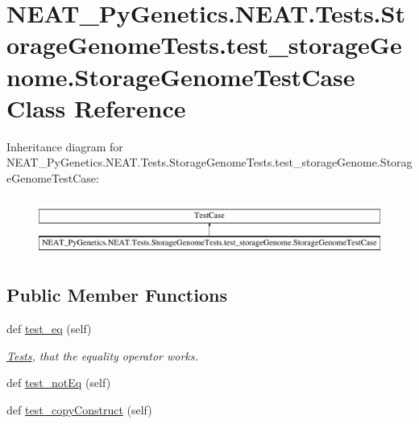 \hypertarget{classNEAT__PyGenetics_1_1NEAT_1_1Tests_1_1StorageGenomeTests_1_1test__storageGenome_1_1StorageGenomeTestCase}{}\section{N\+E\+A\+T\+\_\+\+Py\+Genetics.\+N\+E\+A\+T.\+Tests.\+Storage\+Genome\+Tests.\+test\+\_\+storage\+Genome.\+Storage\+Genome\+Test\+Case Class Reference}
\label{classNEAT__PyGenetics_1_1NEAT_1_1Tests_1_1StorageGenomeTests_1_1test__storageGenome_1_1StorageGenomeTestCase}
Inheritance diagram for N\+E\+A\+T\+\_\+\+Py\+Genetics.\+N\+E\+A\+T.\+Tests.\+Storage\+Genome\+Tests.\+test\+\_\+storage\+Genome.\+Storage\+Genome\+Test\+Case\+:\begin{figure}[H]
\begin{center}
\leavevmode
\includegraphics[height=1.927711cm]{classNEAT__PyGenetics_1_1NEAT_1_1Tests_1_1StorageGenomeTests_1_1test__storageGenome_1_1StorageGenomeTestCase}
\end{center}
\end{figure}
\subsection*{Public Member Functions}
\begin{DoxyCompactItemize}
\item 
def \hyperlink{classNEAT__PyGenetics_1_1NEAT_1_1Tests_1_1StorageGenomeTests_1_1test__storageGenome_1_1StorageGenomeTestCase_a27b58493e931470520a1e71e514009cb}{test\+\_\+eq} (self)
\begin{DoxyCompactList}\small\item\em \hyperlink{namespaceNEAT__PyGenetics_1_1NEAT_1_1Tests}{Tests}, that the equality operator works. \end{DoxyCompactList}\item 
def \hyperlink{classNEAT__PyGenetics_1_1NEAT_1_1Tests_1_1StorageGenomeTests_1_1test__storageGenome_1_1StorageGenomeTestCase_a01f81b00e989464c932df722135daf5c}{test\+\_\+not\+Eq} (self)
\item 
def \hyperlink{classNEAT__PyGenetics_1_1NEAT_1_1Tests_1_1StorageGenomeTests_1_1test__storageGenome_1_1StorageGenomeTestCase_a4c670f9b3e78d2be50280880f1de23d5}{test\+\_\+copy\+Construct} (self)
\end{DoxyCompactItemize}


